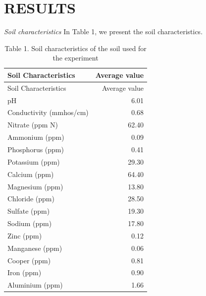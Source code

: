 \documentclass[11pt,]{article}
\begin{document}
\newpage  

\section{RESULTS}\label{results}

\emph{Soil characteristics} In Table 1, we present the soil
characteristics.\\
\hspace*{0.333em}

\begin{longtable}[]{@{}lr@{}}
\caption{Table 1. Soil characteristics of the soil used for the
experiment}\tabularnewline
\toprule
Soil Characteristics & Average value\tabularnewline
\midrule
\endfirsthead
\toprule
Soil Characteristics & Average value\tabularnewline
\midrule
\endhead
pH & 6.01\tabularnewline
Conductivity (mmhos/cm) & 0.68\tabularnewline
Nitrate (ppm N) & 62.40\tabularnewline
Ammonium (ppm) & 0.09\tabularnewline
Phosphorus (ppm) & 0.41\tabularnewline
Potassium (ppm) & 29.30\tabularnewline
Calcium (ppm) & 64.40\tabularnewline
Magnesium (ppm) & 13.80\tabularnewline
Chloride (ppm) & 28.50\tabularnewline
Sulfate (ppm) & 19.30\tabularnewline
Sodium (ppm) & 17.80\tabularnewline
Zinc (ppm) & 0.12\tabularnewline
Manganese (ppm) & 0.06\tabularnewline
Cooper (ppm) & 0.81\tabularnewline
Iron (ppm) & 0.90\tabularnewline
Aluminium (ppm) & 1.66\tabularnewline
\bottomrule
\end{longtable}

~
\end{document}

